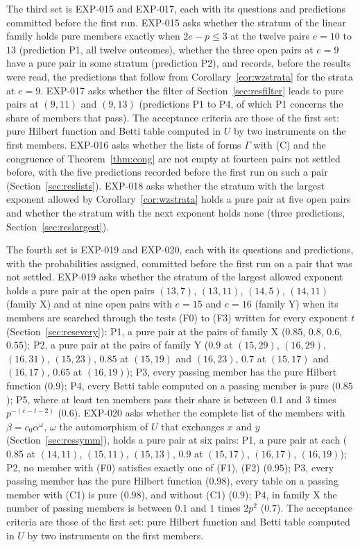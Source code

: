 \documentclass[11pt]{article}
\theoremstyle{definition}
\theoremstyle{remark}
\newcommand{\EXP}[1]{\mbox{EXP-#1}}
\begin{document}
The third set is \EXP{015} and \EXP{017}, each with its questions and predictions committed before the first run. \EXP{015} asks whether the stratum of the linear family holds pure members exactly when $2e-p\le3$ at the twelve pairs $e=10$ to $13$ (prediction P1, all twelve outcomes), whether the three open pairs at $e=9$ have a pure pair in some stratum (prediction P2), and records, before the results were read, the predictions that follow from Corollary~\ref{cor:wzstrata} for the strata at $e=9$. \EXP{017} asks whether the filter of Section~\ref{sec:resfilter} leads to pure pairs at $(9,11)$ and $(9,13)$ (predictions P1 to P4, of which P1 concerns the share of members that pass). The acceptance criteria are those of the first set: pure Hilbert function and Betti table computed in $U$ by two instruments on the first members. \EXP{016} asks whether the lists of forms $\Gamma$ with (C) and the congruence of Theorem~\ref{thm:cong} are not empty at fourteen pairs not settled before, with the five predictions recorded before the first run on such a pair (Section~\ref{sec:reslists}). \EXP{018} asks whether the stratum with the largest exponent allowed by Corollary~\ref{cor:wzstrata} holds a pure pair at five open pairs and whether the stratum with the next exponent holds none (three predictions, Section~\ref{sec:reslargest}).

The fourth set is \EXP{019} and \EXP{020}, each with its questions and predictions, with the probabilities assigned, committed before the first run on a pair that was not settled. \EXP{019} asks whether the stratum of the largest allowed exponent holds a pure pair at the open pairs $(13,7)$, $(13,11)$, $(14,5)$, $(14,11)$ (family X) and at nine open pairs with $e=15$ and $e=16$ (family Y) when its members are searched through the tests (F0) to (F3) written for every exponent $t$ (Section~\ref{sec:resevery}): P1, a pure pair at the pairs of family X ($0.85$, $0.8$, $0.6$, $0.55$); P2, a pure pair at the pairs of family Y ($0.9$ at $(15,29)$, $(16,29)$, $(16,31)$, $(15,23)$, $0.85$ at $(15,19)$ and $(16,23)$, $0.7$ at $(15,17)$ and $(16,17)$, $0.65$ at $(16,19)$); P3, every passing member has the pure Hilbert function ($0.9$); P4, every Betti table computed on a passing member is pure ($0.85$); P5, where at least ten members pass their share is between $0.1$ and $3$ times $p^{-(e-t-2)}$ ($0.6$). \EXP{020} asks whether the complete list of the members with $\beta=c_0\alpha^\omega$, $\omega$ the automorphism of $U$ that exchanges $x$ and $y$ (Section~\ref{sec:ressymm}), holds a pure pair at six pairs: P1, a pure pair at each ($0.85$ at $(14,11)$, $(15,11)$, $(15,13)$, $0.9$ at $(15,17)$, $(16,17)$, $(16,19)$); P2, no member with (F0) satisfies exactly one of (F1), (F2) ($0.95$); P3, every passing member has the pure Hilbert function ($0.98$), every table on a passing member with (C1) is pure ($0.98$), and without (C1) ($0.9$); P4, in family X the number of passing members is between $0.1$ and $1$ times $2p^2$ ($0.7$). The acceptance criteria are those of the first set: pure Hilbert function and Betti table computed in $U$ by two instruments on the first members.
\end{document}
